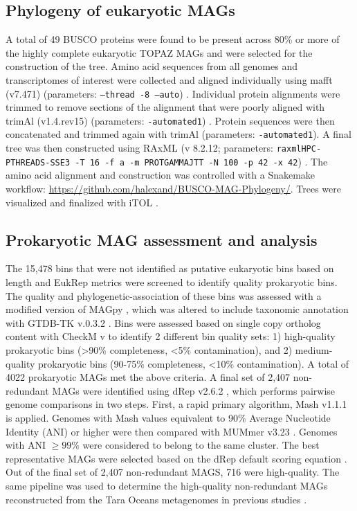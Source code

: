 \documentclass[12pt]{article}
\numberwithin{equation}{section}
\begin{document}
\subsection*{Phylogeny of eukaryotic MAGs} 
A total of 49 BUSCO proteins were found to be present across 80\% or more of the highly complete eukaryotic TOPAZ MAGs and were selected for the construction of the tree. Amino acid sequences from all genomes and transcriptomes of interest were collected and aligned individually using mafft (v7.471) (parameters: \texttt{--thread -8 –auto}) \citep{Katoh2013MAFFT}. Individual protein alignments were trimmed to remove sections of the alignment that were poorly aligned with trimAl (v1.4.rev15) (parameters: \texttt{-automated1}) \citep{Capella-Gutierrez2009trimAl}. Protein sequences were then concatenated and trimmed again with trimAl (parameters: \texttt{-automated1}). A final tree was then constructed using RAxML (v 8.2.12; parameters: \texttt{raxmlHPC-PTHREADS-SSE3 -T 16 -f a -m PROTGAMMAJTT -N 100 -p 42 -x 42}) \citep{Stamatakis2014RAxML}. The amino acid alignment and construction was controlled with a Snakemake workflow: \url{https://github.com/halexand/BUSCO-MAG-Phylogeny/}. Trees were visualized and finalized with iTOL \citep{Letunic2016Interactive}. 

\subsection*{Prokaryotic MAG assessment and analysis} 
The 15,478 bins that were not identified as putative eukaryotic bins based on length and EukRep metrics were screened to identify quality prokaryotic bins. The quality and phylogenetic-association of these bins was assessed with a modified version of MAGpy \citep{Stewart2019MAGpy}, which was altered to include taxonomic annotation with GTDB-TK v.0.3.2 \citep{Chaumeil_2019}. Bins were assessed based on single copy ortholog content with CheckM v \citep{Parks2015CheckM} to identify 2 different bin quality sets: 1) high-quality prokaryotic bins (>90\% completeness, <5\% contamination), and 2) medium-quality prokaryotic bins (90-75\% completeness, <10\% contamination). A total of 4022 prokaryotic MAGs met the above criteria. A final set of 2,407 non-redundant MAGs were identified using dRep v2.6.2 \citep{Olm_2017}, which performs pairwise genome comparisons in two steps. First, a rapid primary algorithm, Mash v1.1.1 \citep{Ondov_2016} is applied. Genomes with Mash values equivalent to 90\% Average Nucleotide Identity (ANI) or higher were then compared with MUMmer v3.23 \citep{Mar_ais_2018}. Genomes with ANI $\geq99\%$ were considered to belong to the same cluster. The best representative MAGs were selected based on the dRep default scoring equation \citep{Olm_2017}. Out of the final set of 2,407 non-redundant MAGS, 716 were high-quality. The same pipeline was used to determine the high-quality non-redundant MAGs reconstructed from the Tara Oceans metagenomes in previous studies \citep{Tully2018reconstruction, Parks2017Recovery, Delmont2018Nitrogen-fixing}.
\end{document}
